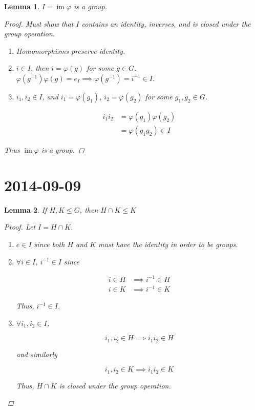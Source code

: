 \documentclass{article}
\newtheorem{lemma}{Lemma}
\DeclareMathOperator{\im}{im}
\begin{document}
\begin{lemma}
  $I = \im \varphi$ is a group.

  \begin{proof}
    Must show that $I$ contains an identity, inverses, and is closed under the group operation.

    \begin{enumerate}
    \item Homomorphisms preserve identity.
    \item $i \in I$, then $i = \varphi(g)$ for some $g \in
      G$. $\varphi(g^{-1}) \varphi(g) = e_I \implies \varphi(g^{-1}) =
      i^{-1} \in I$.
    \item $i_1, i_2 \in I$, and $i_1 = \varphi(g_1)$, $i_2 =
      \varphi(g_2)$ for some $g_1, g_2 \in G$.

    \begin{align*}
      i_1 i_2 &= \varphi(g_1) \varphi(g_2)\\
      &= \varphi(g_1 g_2) \in I
    \end{align*}
    \end{enumerate}

   Thus $\im \varphi$ is a group.
  \end{proof}
\end{lemma}

\part*{2014-09-09}

\begin{lemma}
  If $H, K \leq G$, then $H \cap K \leq K$

  \begin{proof}
    Let $I = H \cap K$.

    \begin{enumerate}
    \item $e \in I$ since both $H$ and $K$ must have the identity in order to be groups.
    \item $\forall i \in I$, $i^{-1} \in I$ since

      \begin{align*}
        i \in H &\implies i^{-1} \in H\\
        i \in K &\implies i^{-1} \in K
      \end{align*}

      Thus, $i^{-1} \in I$.

    \item $\forall i_1, i_2 \in I$,

      \[i_1, i_2 \in H \implies i_1 i_2 \in H\]

      and similarly

      \[i_1, i_2 \in K \implies i_1 i_2 \in K\]

      Thus, $H \cap K$ is closed under the group operation.
    \end{enumerate}
  \end{proof}
\end{lemma}
\end{document}
